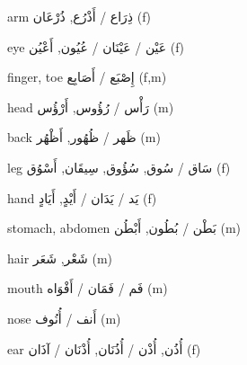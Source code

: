 \documentclass[avery5371,grid,frame]{flashcards}
\newcommand{\ta}[1]{\textarabic{\larger[2] #1}}
\begin{document}
\pagestyle{fancy}


\begin{flashcard}{\LARGE arm}
\LARGE \ta{ذِرَاع / أَذْرُع, ذُرْعَان} (f)
\end{flashcard}
\begin{flashcard}{\LARGE eye}
\LARGE \ta{عَيْن / عَيْنَان / عُيُون, أَعْيُن} (f)
\end{flashcard}
\begin{flashcard}{\LARGE finger, toe}
\LARGE \ta{إِصْبَع / أَصَابِع} (f,m)
\end{flashcard}
\begin{flashcard}{\LARGE head}
\LARGE \ta{رَأْس / رُؤُوس, أَرْؤُس} (m)
\end{flashcard}
\begin{flashcard}{\LARGE back}
\LARGE \ta{ظَهر / ظُهُور, أَظْهُر} (m)
\end{flashcard}
\begin{flashcard}{\LARGE leg}
\LARGE \ta{سَاق / سُوق, سُؤُوق, سِيقَان, أَسْوُق} (f)
\end{flashcard}
\begin{flashcard}{\LARGE hand}
\LARGE \ta{يَد / يَدَان / أَيْدٍ, أَيَادٍ} (f)
\end{flashcard}
\begin{flashcard}{\LARGE stomach, abdomen}
\LARGE \ta{بَطْن / بُطُون, أَبْطُن} (m)
\end{flashcard}
\begin{flashcard}{\LARGE hair}
\LARGE \ta{شَعْر, شَعَر} (m)
\end{flashcard}
\begin{flashcard}{\LARGE mouth}
\LARGE \ta{فَم / فَمَان / أَفْوَاه} (m)
\end{flashcard}
\begin{flashcard}{\LARGE nose}
\LARGE \ta{أَنف / أُنُوف} (m)
\end{flashcard}
\begin{flashcard}{\LARGE ear}
\LARGE \ta{أُذُن, أُذْن / أُذُنَان, أُذْنَان / آذَان} (f)
\end{flashcard}
\end{document}
